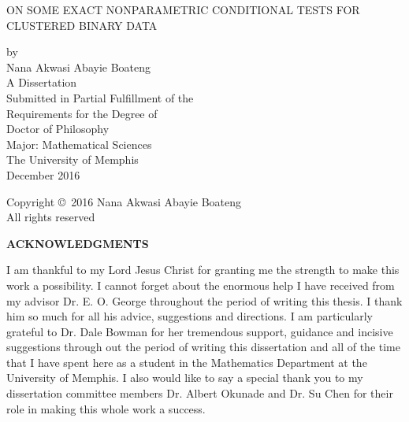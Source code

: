 \documentclass[12pt,oneside]{report}
\theoremstyle{definition}
\theoremstyle{mystyle}
\begin{document}
\raggedright
\doublespacing
\setlength{\parindent}{1.5em} %
\begin{center}
\vspace*{.625in}ON SOME EXACT   NONPARAMETRIC CONDITIONAL TESTS FOR CLUSTERED BINARY DATA\bigskip

by\\
Nana Akwasi Abayie Boateng\\

\vspace{1.4in}A Dissertation\\
Submitted in Partial Fulfillment of the\\
Requirements for the Degree of\\
Doctor of Philosophy\\

\vspace{.5in}Major: Mathematical Sciences\\

\vspace{1in}The University of Memphis\\
December 2016\\ \thispagestyle{empty}
\end{center}

\pagebreak
\newpage

\setcounter{page}{2}
\vspace*{3in}
\begin{center}
\vspace{.5in}
Copyright \copyright\ 2016 Nana Akwasi Abayie Boateng\\
All rights reserved
\end{center}
\newpage

\singlespacing
\begin{center}\textbf{ACKNOWLEDGMENTS}\end{center}
\doublespacing


I am thankful to my Lord Jesus Christ for granting me the strength
to  make this work a possibility. I cannot forget about the enormous
help I  have received from my advisor Dr. E. O. George throughout the
period of writing this thesis. I thank him so much for all his
advice, suggestions and directions.
I am particularly grateful to  Dr. Dale Bowman for her 
tremendous support, guidance and incisive  suggestions   through out the period of writing  this dissertation   and   all of the time that I have spent here as a student in
the Mathematics Department at the University of Memphis.
I also would like to say a special thank you to my dissertation 
committee members Dr. Albert Okunade  and Dr. Su Chen for their role in
making this whole work a success.
 \\
\end{document}
